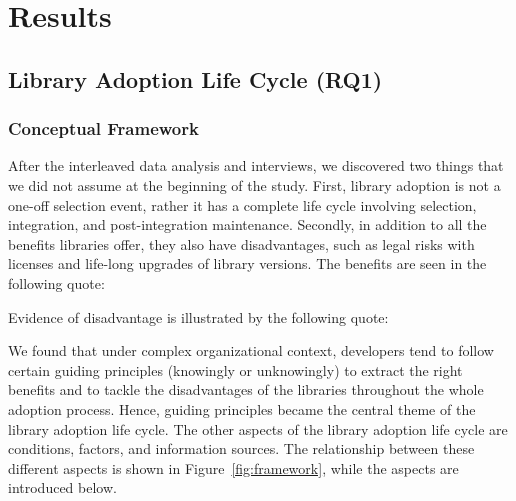 \section{Results}
\subsection{Library Adoption Life Cycle (RQ1)}\label{sec:rq1}
\subsubsection{Conceptual Framework}\label{sec:framework}

After the interleaved data analysis and interviews, we discovered two things that we did not assume at the beginning of the study. First, library adoption is not a one-off selection event, rather it has a complete life cycle involving selection, integration, and post-integration maintenance. Secondly, in addition to all the benefits libraries offer, they also have disadvantages, such as legal risks with licenses and life-long upgrades of library versions. The benefits are seen in the following quote:

Evidence of disadvantage is illustrated by the following quote:
 
We found that under complex organizational context, developers tend to follow certain guiding principles (knowingly or unknowingly) to extract the right benefits and to tackle the disadvantages of the libraries throughout the whole adoption process. Hence, guiding principles became the central theme of the library adoption life cycle. The other aspects of the library adoption life cycle are conditions, factors, and information sources. The relationship between these different aspects is shown in Figure~\ref{fig:framework}, while the aspects are introduced below.

